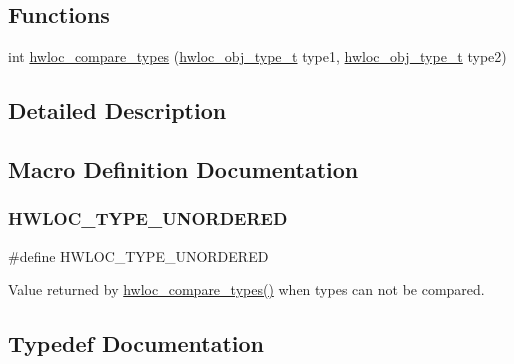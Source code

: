 \subsection*{Functions}
\begin{DoxyCompactItemize}
\item 
int \hyperlink{a00184_ga1820ea0dfd8e9dca28f9ea7624df5ae2}{hwloc\+\_\+compare\+\_\+types} (\hyperlink{a00184_gacd37bb612667dc437d66bfb175a8dc55}{hwloc\+\_\+obj\+\_\+type\+\_\+t} type1, \hyperlink{a00184_gacd37bb612667dc437d66bfb175a8dc55}{hwloc\+\_\+obj\+\_\+type\+\_\+t} type2)
\end{DoxyCompactItemize}


\subsection{Detailed Description}


\subsection{Macro Definition Documentation}
\mbox{\label{a00184_ga3b6e4128e9fe773863b123fa6e4a080b}} 
\subsubsection{\texorpdfstring{H\+W\+L\+O\+C\+\_\+\+T\+Y\+P\+E\+\_\+\+U\+N\+O\+R\+D\+E\+R\+ED}{HWLOC\_TYPE\_UNORDERED}}
{\footnotesize\ttfamily \#define H\+W\+L\+O\+C\+\_\+\+T\+Y\+P\+E\+\_\+\+U\+N\+O\+R\+D\+E\+R\+ED}



Value returned by \hyperlink{a00184_ga1820ea0dfd8e9dca28f9ea7624df5ae2}{hwloc\+\_\+compare\+\_\+types()} when types can not be compared. 



\subsection{Typedef Documentation}
\mbox{\label{a00184_ga0a947e8c5adcc729b126bd09c01a0153}} 
